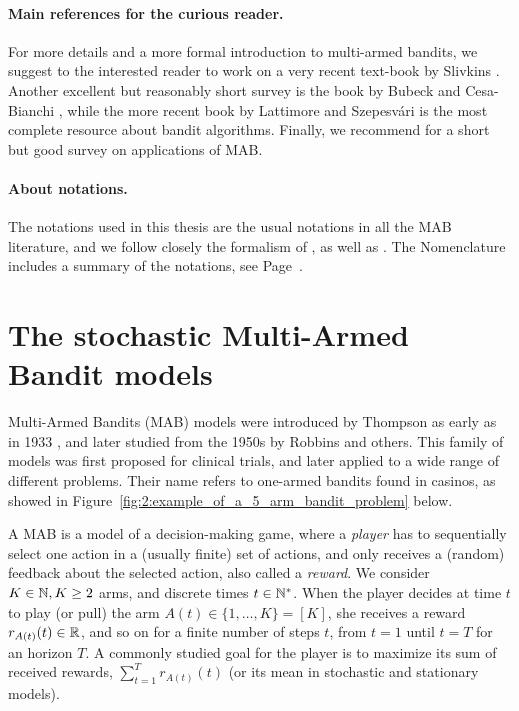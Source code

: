 \paragraph{Main references for the curious reader.}
%
For more details and a more formal introduction to multi-armed bandits, we suggest to the interested reader to work on a very recent text-book by Slivkins \cite{Slivkins2019}.
Another excellent but reasonably short survey is the book by Bubeck and Cesa-Bianchi \cite{Bubeck12}, while the more recent book by Lattimore and Szepesv{\'a}ri \cite{LattimoreBanditAlgorithmsBook} is the most complete resource about bandit algorithms.
Finally, we recommend \cite{bouneffouf2019survey} for a short but good survey on applications of MAB.

\paragraph{About notations.}
%
The notations used in this thesis are the usual notations in all the MAB literature, and we follow closely the formalism of \cite{Kaufmann12PhD}, as well as \cite{Slivkins2019,LattimoreBanditAlgorithmsBook,Bubeck12}.
The Nomenclature includes a summary of the notations, see Page~\pageref{chapter:nomenclature}.




\section{The stochastic Multi-Armed Bandit models}
\label{sec:2:notations}


Multi-Armed Bandits (MAB) models were introduced by Thompson as early as in 1933 \cite{Thompson33}, and later studied from the 1950s by Robbins \cite{Robbins52} and others.
This family of models was first proposed for clinical trials, and later applied to a wide range of different problems.
Their name refers to one-armed bandits found in casinos, as showed in Figure~\ref{fig:2:example_of_a_5_arm_bandit_problem} below.


A MAB is a model of a decision-making game, where a \emph{player} has to sequentially select one action in a (usually finite) set of actions, and only receives a (random) feedback about the selected action, also called a \emph{reward}.
We consider $K\in\mathbb{N}, K\geq2$ arms, and discrete times $t\in\mathbb{N}^*$.
When the player decides at time $t$ to play (or pull) the arm $A(t)\in\{1,\dots,K\}=[K]$, she receives a reward $r_{A(t)}(t)\in\mathbb{R}$, and so on for a finite number of steps $t$, from $t=1$ until $t=T$ for an horizon $T$.
%
A commonly studied goal for the player is to maximize its sum of received rewards, $\sum_{t=1}^T r_{A(t)}(t)$
(or its mean in stochastic and stationary models).


